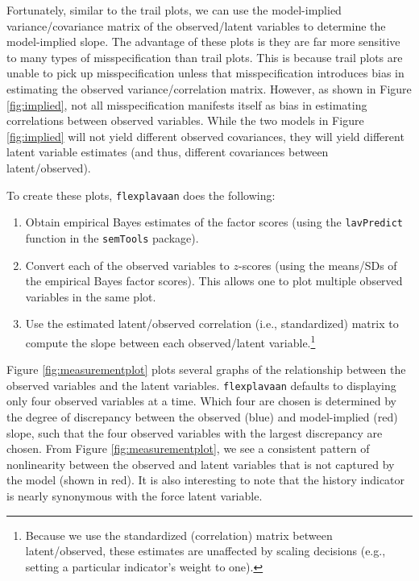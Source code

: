 \documentclass[
  english,
  man]{apa6}
\providecommand{\tightlist}{%
  \setlength{\itemsep}{0pt}\setlength{\parskip}{0pt}}
\begin{document}
Fortunately, similar to the trail plots, we can use the model-implied variance/covariance matrix of the observed/latent variables to determine the model-implied slope. The advantage of these plots is they are far more sensitive to many types of misspecification than trail plots. This is because trail plots are unable to pick up misspecification unless that misspecification introduces bias in estimating the observed variance/correlation matrix. However, as shown in Figure \ref{fig:implied}, not all misspecification manifests itself as bias in estimating correlations between observed variables. While the two models in Figure \ref{fig:implied} will not yield different observed covariances, they will yield different latent variable estimates (and thus, different covariances between latent/observed).

To create these plots, \texttt{flexplavaan} does the following:

\begin{enumerate}
\def\labelenumi{\arabic{enumi}.}
\tightlist
\item
  Obtain empirical Bayes estimates of the factor scores (using the \texttt{lavPredict} function in the \texttt{semTools} package).
\item
  Convert each of the observed variables to \(z\)-scores (using the means/SDs of the empirical Bayes factor scores). This allows one to plot multiple observed variables in the same plot.
\item
  Use the estimated latent/observed correlation (i.e., standardized) matrix to compute the slope between each observed/latent variable.\footnote{Because we use the standardized (correlation) matrix between latent/observed, these estimates are unaffected by scaling decisions (e.g., setting a particular indicator's weight to one).}
\end{enumerate}

Figure \ref{fig:measurementplot} plots several graphs of the relationship between the observed variables and the latent variables. \texttt{flexplavaan} defaults to displaying only four observed variables at a time. Which four are chosen is determined by the degree of discrepancy between the observed (blue) and model-implied (red) slope, such that the four observed variables with the largest discrepancy are chosen. From Figure \ref{fig:measurementplot}, we see a consistent pattern of nonlinearity between the observed and latent variables that is not captured by the model (shown in red). It is also interesting to note that the history indicator is nearly synonymous with the force latent variable.
\end{document}
